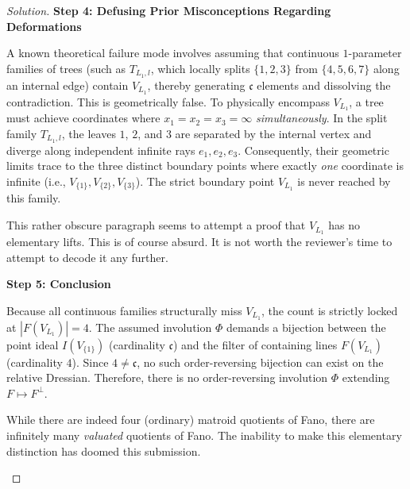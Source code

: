 \documentclass[12pt]{article}
\newcommand{\review}[1]{\begin{reviewbox}#1\end{reviewbox}}
\begin{document}
\begin{proof}[Solution]
\medskip
\noindent \textbf{Step 4: Defusing Prior Misconceptions Regarding Deformations}

A known theoretical failure mode involves assuming that continuous $1$-parameter families of trees (such as $T_{L_1, l}$, which locally splits $\{1,2,3\}$ from $\{4,5,6,7\}$ along an internal edge) contain $V_{L_1}$, thereby generating $\mathfrak{c}$ elements and dissolving the contradiction. This is geometrically false. To physically encompass $V_{L_1}$, a tree must achieve coordinates where $x_1=x_2=x_3=\infty$ \emph{simultaneously}. In the split family $T_{L_1, l}$, the leaves $1$, $2$, and $3$ are separated by the internal vertex and diverge along independent infinite rays $e_1, e_2, e_3$. Consequently, their geometric limits trace to the three distinct boundary points where exactly \emph{one} coordinate is infinite (i.e., $V_{\{1\}}, V_{\{2\}}, V_{\{3\}}$). The strict boundary point $V_{L_1}$ is never reached by this family.
\review{
This rather obscure paragraph seems to attempt a proof that $V_{L_1}$ has no elementary lifts. This is of course absurd. It is not worth the reviewer's time to attempt to decode it any further.
}

\medskip
\noindent \textbf{Step 5: Conclusion}

Because all continuous families structurally miss $V_{L_1}$, the count is strictly locked at $|F(V_{L_1})| = 4$. The assumed involution $\Phi$ demands a bijection between the point ideal $I(V_{\{1\}})$ (cardinality $\mathfrak{c}$) and the filter of containing lines $F(V_{L_1})$ (cardinality $4$). Since $4 \neq \mathfrak{c}$, no such order-reversing bijection can exist on the relative Dressian. 
Therefore, there is no order-reversing involution $\Phi$ extending $F \mapsto F^\perp$.
\review{
    While there are indeed four (ordinary) matroid quotients of Fano, there are infinitely many \emph{valuated} quotients of Fano. The inability to make this elementary distinction has doomed this submission.
}
\end{proof}
\end{document}
